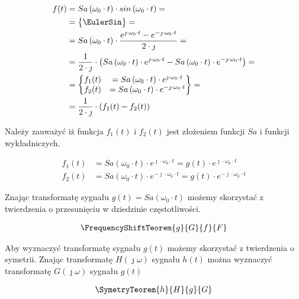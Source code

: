 \begin{task}
\begin{align*}
f(t) &= Sa\left(\omega_0 \cdot t\right) \cdot sin\left(\omega_0 \cdot t\right)=\\
&=\begin{Bmatrix}
\EulerSin
\end{Bmatrix}=\\
&= Sa\left(\omega_0 \cdot t\right) \cdot \frac{e^{\jmath \cdot \omega_0 \cdot t} - e^{-\jmath \cdot \omega_0 \cdot t}}{2 \cdot \jmath}=\\
&= \frac{1}{2 \cdot \jmath} \cdot \left( Sa\left(\omega_0 \cdot t\right) \cdot e^{\jmath \cdot \omega_0 \cdot t} - Sa\left(\omega_0 \cdot t\right) \cdot e^{-\jmath \cdot \omega_0 \cdot t} \right)=\\
&=\begin{Bmatrix}
f_1(t) &= Sa\left(\omega_0 \cdot t\right) \cdot e^{\jmath \cdot \omega_0 \cdot t} \\
f_2(t) &= Sa\left(\omega_0 \cdot t\right) \cdot e^{-\jmath \cdot \omega_0 \cdot t}
\end{Bmatrix}=\\
&=\frac{1}{2 \cdot \jmath} \cdot \left(f_1(t) - f_2(t) \right)
\end{align*}

Należy zauważyć iż funkcja $f_1(t)$ i $f_2(t)$ jest złożeniem funkcji $Sa$ i funkcji wykładniczych.

\begin{align*}
f_1(t) &= Sa\left(\omega_0 \cdot t\right) \cdot e^{\jmath \cdot \omega_0 \cdot t} = g(t)\cdot e^{\jmath \cdot \omega_0 \cdot t}\\
f_2(t) &= Sa\left(\omega_0 \cdot t\right) \cdot e^{-\jmath \cdot \omega_0 \cdot t} = g(t) \cdot e^{-\jmath \cdot \omega_0 \cdot t}
\end{align*}

Znając transformatę sygnału $g(t) = Sa\left(\omega_0 \cdot t\right)$ możemy skorzystać z twierdzenia o przesunięciu w dziedzinie częstotliwości. 

\begin{align*}
\FrequencyShiftTeorem{g}{G}{f}{F}
\end{align*}

Aby wyznaczyć transformatę sygnału $g(t)$ możemy skorzystać z twierdzenia o symetrii. Znając transformatę $H(\jmath \omega)$ sygnału $h(t)$ można wyznaczyć transformatę $G(\jmath \omega)$ sygnału $g(t)$

\begin{align*}
\SymetryTeorem{h}{H}{g}{G}
\end{align*}


\end{task}
